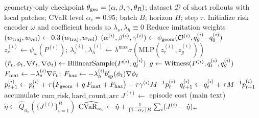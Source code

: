 \begin{algorithm}[htbp]
\caption{Material-aware Hamiltonian learning (training).}
\label{alg:train}
\begin{algorithmic}[1]
\Require geometry-only checkpoint $\theta_{\rm geo}=(\alpha,\beta,\gamma,\theta_R)$;
         dataset $\mathcal D$ of short rollouts with local patches; CVaR level
         $\alpha_c{=}0.95$; batch $B$; horizon $H$; step $\tau$.
\State Initialize risk encoder $\omega$ and coefficient heads so
       $\lambda_s,\lambda_h\equiv0$ 
\State Reduce imitation weights $(w_{\rm traj},w_{\rm vel})\leftarrow0.3\,(w_{\rm traj},w_{\rm vel})$
    \State $(\alpha^{(i)},\beta^{(i)},\gamma^{(i)})\leftarrow\phi_{\rm geom}(\mathcal O^{(i)},q_g^{(i)}{-}q_0^{(i)})$
    \State $z_r^{(i)}\leftarrow\psi_\omega(P^{(i)})$;\quad
           $\lambda_s^{(i)},\lambda_h^{(i)}\leftarrow\lambda^{\max}\sigma(\mathrm{MLP}(z_r^{(i)},z_g^{(i)}))$
      \State $(\tilde r_t,\phi_t,\nabla\tilde r_t,\nabla\phi_t)\leftarrow\mathrm{BilinearSample}(P^{(i)},q_t^{(i)})$
      \State $g\leftarrow\mathrm{Witness}(P^{(i)},q_t^{(i)},q_g^{(i)})$
      \State $F_{\rm mat}\leftarrow-\lambda_s^{(i)}\nabla\tilde r_t$;\quad
             $F_{\rm haz}\leftarrow-\lambda_h^{(i)}b_{\rm sp}'(\phi_t)\nabla\phi_t$
      \State $p_{t+1}^{(i)}\leftarrow p_t^{(i)}+\tau\bigl(F_{\rm geom}+g\,F_{\rm mat}+F_{\rm haz}\bigr)-\tau\gamma^{(i)}M^{-1}p_t^{(i)}$
      \State $q_{t+1}^{(i)}\leftarrow q_t^{(i)}+\tau M^{-1}p_{t+1}^{(i)}$
      \State accumulate $\mathrm{cum\_risk},\mathrm{hard\_count},\mathrm{arc}$
    \EndFor
    \State $J^{(i)}\leftarrow$ episode cost (main text)
    \State $\hat\eta\leftarrow\widehat Q_{\alpha_c}(\{J^{(i)}\}_{i=1}^B)$
    \State $\widehat{\mathrm{CVaR}_{\alpha_c}}\leftarrow\hat\eta+\tfrac{1}{(1-\alpha_c)B}\sum_i(J^{(i)}-\hat\eta)_+$

\end{algorithmic}
\end{algorithm}
